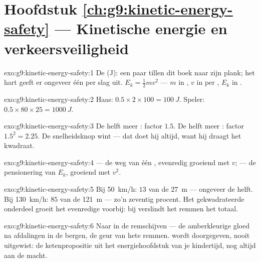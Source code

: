 \section*{Hoofdstuk \ref{ch:g9:kinetic-energy-safety} --- Kinetische energie en verkeersveiligheid}

\begin{solution}{exo:g9:kinetic-energy-safety:1}
De  (\unit{J}): een paar  tillen dit boek
naar zijn plank; het hart geeft er ongeveer één per slag uit. $E_k =
\frac12 m v^2$ --- $m$ in , $v$ in
 per , $E_k$ in .
\end{solution}

\begin{solution}{exo:g9:kinetic-energy-safety:2}
Haas: $0.5 \times 2 \times 100 = \qty{100}{J}$. Speler: $0.5 \times 80
\times 25 = \qty{1000}{J}$.
\end{solution}

\begin{solution}{exo:g9:kinetic-energy-safety:3}
De helft meer : factor $1.5$. De helft meer
: factor $1.5^2 = 2.25$. De snelheidsknop wint --- dat
doet hij altijd, want hij draagt het kwadraat.
\end{solution}

\begin{solution}{exo:g9:kinetic-energy-safety:4}
 --- de weg van één , evenredig groeiend
met $v$;  --- de pensionering van $E_k$, groeiend met
$v^2$.
\end{solution}

\begin{solution}{exo:g9:kinetic-energy-safety:5}
Bij \qty{50}{km/h}: $13$ van de \qty{27}{m} --- ongeveer de helft. Bij
\qty{130}{km/h}: $85$ van de \qty{121}{m} --- zo'n zeventig procent.
Het gekwadrateerde onderdeel groeit het evenredige voorbij: bij
 verslindt het remmen het totaal.
\end{solution}

\begin{solution}{exo:g9:kinetic-energy-safety:6}
Naar  in de remschijven --- de amberkleurige gloed na
afdalingen in de bergen, de geur van hete remmen.
 wordt doorgegeven, nooit uitgewist: de ketenpropositie
uit het energiehoofdstuk van je kindertijd, nog altijd aan de
macht.
\end{solution}

